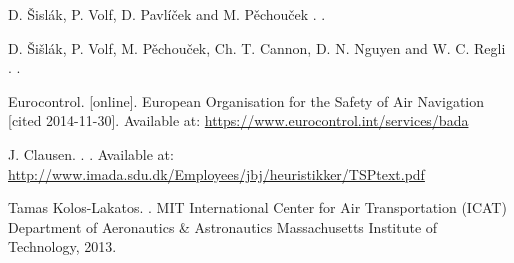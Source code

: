 \begin{thebibliography}{1}
D. Šislák, P. Volf, D. Pavlíček and M. Pěchouček
.
.

D. Šišlák, P. Volf, M. Pěchouček, Ch. T. Cannon, D. N. Nguyen and W. C. Regli
.
.

Eurocontrol.
 [online].
\newblock European Organisation for the Safety of Air Navigation [cited 2014-11-30].
\newblock Available at: \url{https://www.eurocontrol.int/services/bada}

J. Clausen.
.
.
\newblock Available at: \url{http://www.imada.sdu.dk/Employees/jbj/heuristikker/TSPtext.pdf}

Tamas Kolos-Lakatos.
.
\newblock MIT International Center for Air Transportation (ICAT) Department of Aeronautics \& Astronautics Massachusetts Institute of Technology, 2013.






\end{thebibliography}
